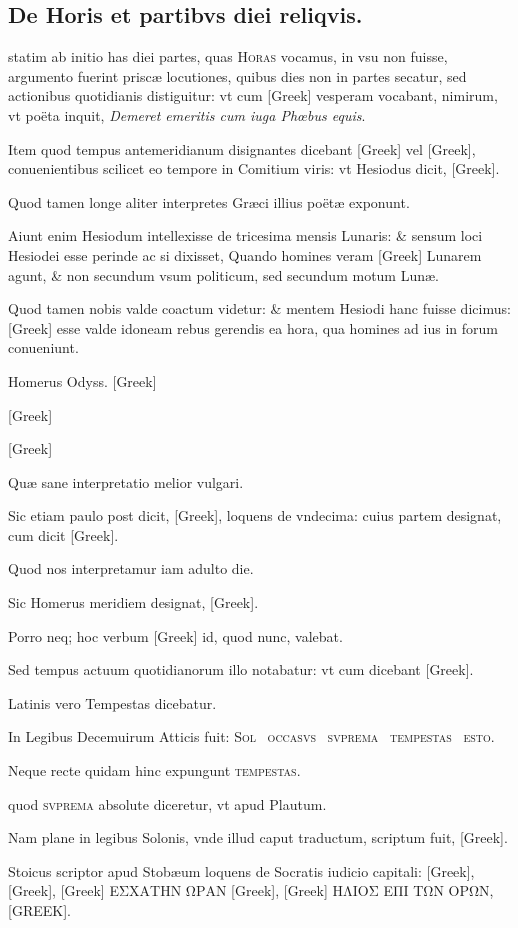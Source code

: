 \subsection[De Horis \& partibus diei reliquis.]{De Horis et partibvs diei reliqvis.}
\setcounter{parcount}{0}
\begin{parnumbers}

 statim ab initio has diei partes, quas \textsc{Horas}
vocamus, in vsu non fuisse, argumento fuerint priscæ locutiones,
 quibus dies non in partes secatur, sed actionibus quotidianis
distiguitur: vt cum \textgreek{[Greek]} vesperam vocabant, nimirum, vt poëta
inquit, \textit{Demeret emeritis cum iuga Phœbus equis}.

Item quod tempus
antemeridianum disignantes dicebant \textgreek{[Greek]} vel \textgreek{[Greek]},
conuenientibus scilicet eo tempore in Comitium viris: vt Hesiodus dicit,
\textgreek{[Greek]}.

Quod tamen longe aliter interpretes
Græci illius poëtæ exponunt.

Aiunt enim Hesiodum intellexisse
de tricesima mensis Lunaris: \& sensum loci Hesiodei esse perinde
ac si dixisset, Quando homines veram \textgreek{[Greek]} Lunarem agunt, \&
non secundum vsum politicum, sed secundum motum Lunæ.

Quod 
tamen nobis valde coactum videtur: \& mentem Hesiodi hanc fuisse dicimus:
\textgreek{[Greek]} esse valde idoneam rebus gerendis ea hora, qua homines
ad ius in forum conueniunt.

Homerus Odyss. \textgreek{[Greek]}

\textgreek{[Greek]}

\textgreek{[Greek]}

Quæ sane interpretatio melior vulgari.

Sic etiam paulo post dicit,
\textgreek{[Greek]}, loquens de vndecima: cuius partem designat, cum dicit
\textgreek{[Greek]}.

Quod nos interpretamur iam adulto die.

Sic Homerus
meridiem designat, \textgreek{[Greek]}.

Porro neq;
hoc verbum \textgreek{[Greek]} id, quod nunc, valebat.

Sed tempus actuum quotidianorum
illo notabatur: vt cum dicebant \textgreek{[Greek]}.

 Latinis
vero Tempestas dicebatur.

In Legibus Decemuirum Atticis fuit:
\textsc{Sol~ occasvs~
svprema~ tempestas~ esto}.

Neque recte
quidam hinc expungunt \textsc{tempestas}.

quod \textsc{svprema} absolute
diceretur, vt apud Plautum.

Nam plane in legibus Solonis, vnde illud
caput traductum, scriptum fuit, \textgreek{[Greek]}.

Stoicus
scriptor apud Stobæum loquens de Socratis iudicio capitali: 
\textgreek{[Greek], [Greek], [Greek]
ΕΣΧΑΤΗΝ ΩΡΑΝ [Greek], [Greek] ΗΛΙΟΣ ΕΠΙ ΤΩΝ
ΟΡΩΝ, [GREEK]}.

\end{parnumbers}
